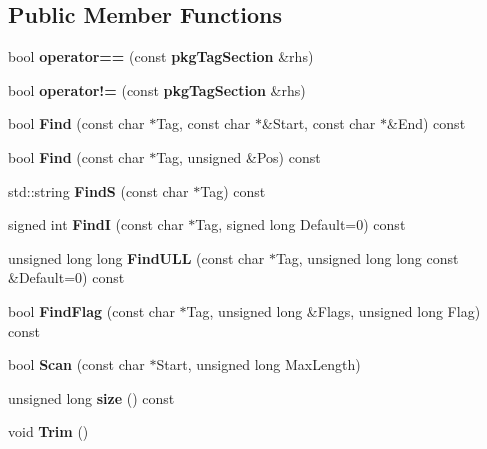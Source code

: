 \subsection*{\-Public \-Member \-Functions}
\begin{DoxyCompactItemize}
\item 
bool {\bfseries operator==} (const {\bf pkg\-Tag\-Section} \&rhs)\label{classpkgTagSection_a8d535d0591c1234b709f5c808fb71597}

\item 
bool {\bfseries operator!=} (const {\bf pkg\-Tag\-Section} \&rhs)\label{classpkgTagSection_a9b9dcf91b4b96baf25ddd2618a72fc95}

\item 
bool {\bfseries \-Find} (const char $\ast$\-Tag, const char $\ast$\&\-Start, const char $\ast$\&\-End) const \label{classpkgTagSection_a1240e898c2db165f00d81a6683b4f51c}

\item 
bool {\bfseries \-Find} (const char $\ast$\-Tag, unsigned \&\-Pos) const \label{classpkgTagSection_acff50f6833015771d25d59ef05a6d417}

\item 
std\-::string {\bfseries \-Find\-S} (const char $\ast$\-Tag) const \label{classpkgTagSection_a70ead39ac1998b79d0a27b77a2cdc4ad}

\item 
signed int {\bfseries \-Find\-I} (const char $\ast$\-Tag, signed long \-Default=0) const \label{classpkgTagSection_abf31816827bdd656eee73defb0661ec1}

\item 
unsigned long long {\bfseries \-Find\-U\-L\-L} (const char $\ast$\-Tag, unsigned long long const \&\-Default=0) const \label{classpkgTagSection_aa1041d1be3db4cfeb4f7db24bc0460a6}

\item 
bool {\bfseries \-Find\-Flag} (const char $\ast$\-Tag, unsigned long \&\-Flags, unsigned long \-Flag) const \label{classpkgTagSection_ae3cfa545010811f0bbf8861e451fa30c}

\item 
bool {\bfseries \-Scan} (const char $\ast$\-Start, unsigned long \-Max\-Length)\label{classpkgTagSection_a03f9b5468030a02b3d4b0511892a09e3}

\item 
unsigned long {\bfseries size} () const \label{classpkgTagSection_a3e13243636f944bad8351324f2910e2b}

\item 
void {\bfseries \-Trim} ()\label{classpkgTagSection_adac3ee4a7c5329167ec378709314a4e3}


\end{DoxyCompactItemize}
